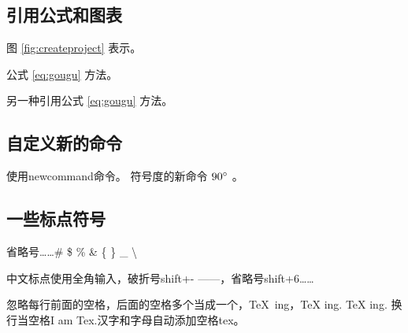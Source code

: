 \subsection{引用公式和图表}
图 \ref{fig:createproject} 表示。

公式 \ref{eq:gougu} 方法。

另一种引用公式 \eqref{eq:gougu} 方法。 %

\subsection{自定义新的命令}
使用newcommand命令。
符号度的新命令 $90^\circ$ 。%

\subsection{一些标点符号}
省略号\ldots \dots \# \quad \$ \quad \% \quad \& \quad \{ \quad \} \quad \_ \quad \textbackslash

中文标点使用全角输入，破折号shift+- ——，省略号shift+6……

忽略每行前面的空格，后面的空格多个当成一个，\TeX\ ing，\TeX{} ing. {\TeX} ing. 换行当空格I 
am Tex.汉字和字母自动添加空格tex。


